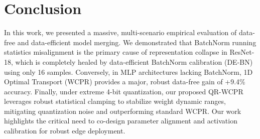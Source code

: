 \documentclass{article}
\theoremstyle{plain}
\theoremstyle{definition}
\theoremstyle{remark}
\begin{document}
\section{Conclusion}
In this work, we presented a massive, multi-scenario empirical evaluation of data-free and data-efficient model merging. We demonstrated that BatchNorm running statistics misalignment is the primary cause of representation collapse in ResNet-18, which is completely healed by data-efficient BatchNorm calibration (DE-BN) using only 16 samples. Conversely, in MLP architectures lacking BatchNorm, 1D Optimal Transport (WCPR) provides a major, robust data-free gain of +9.4\% accuracy. Finally, under extreme 4-bit quantization, our proposed QR-WCPR leverages robust statistical clamping to stabilize weight dynamic ranges, mitigating quantization noise and outperforming standard WCPR. Our work highlights the critical need to co-design parameter alignment and activation calibration for robust edge deployment.



\end{document}
